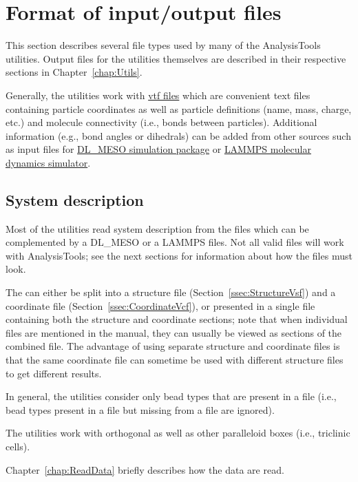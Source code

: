 \chapter{Format of input/output files}\label{chap:input}

This section describes several file types used by many of the
AnalysisTools utilities. Output files for the utilities themselves are
described in their respective sections in Chapter~\ref{chap:Utils}.

Generally, the utilities work with
\href{https://github.com/olenz/vtfplugin/wiki/VTF-format}{vtf files} which
are convenient text files containing particle coordinates as well as
particle definitions (name, mass, charge, etc.) and molecule connectivity
(i.e., bonds between particles). Additional information (e.g., bond angles
or dihedrals) can be added from other sources such as input files for
\href{https://www.scd.stfc.ac.uk/Pages/DL_MESO.aspx}{DL\_MESO simulation
package} or \href{https://lammps.sandia.gov/}{LAMMPS molecular dynamics
simulator}.

\section{System description} %
Most of the utilities read system description from the \vtf files
which can be complemented by a DL\_MESO \field or a LAMMPS \data files. Not
all valid \vtf files will work with AnalysisTools; see the next sections
for information about how the files must look.

The \vtf can either be split into a \vsf structure file
(Section~\ref{ssec:StructureVsf}) and a \vcf coordinate file
(Section~\ref{ssec:CoordinateVcf}), or presented in a single \vtf file
containing both the structure and coordinate sections; note that when
individual \vscf files are mentioned in the manual, they can usually be
viewed as \vscf sections of the combined \vtf file. The advantage of using
separate structure and coordinate files is that the same coordinate file
can sometime be used with different structure files to get different
results.

In general, the utilities consider only bead types that are present in a
\vcf file (i.e., bead types present in a \vsf file but missing from a \vcf
file are ignored).

The utilities work with orthogonal as well as other paralleloid boxes
(i.e., triclinic cells).

Chapter~\ref{chap:ReadData} briefly describes how the data are read.

